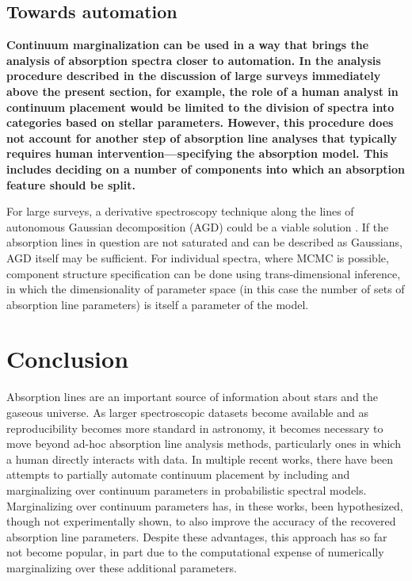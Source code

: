 \documentclass[manuscript]{aastex62}
\begin{document}
\subsection{Towards automation}
{\bf
Continuum marginalization can be used in a way that brings the analysis of absorption spectra closer to automation.
In the analysis procedure described in the discussion of large surveys immediately above the present section, for example, the role of a human analyst in continuum placement would be limited to the division of spectra into categories based on stellar parameters.
However, this procedure does not account for another step of absorption line analyses that typically requires human intervention---specifying the absorption model.
This includes deciding on a number of components into which an absorption feature should be split.

For large surveys, a derivative spectroscopy technique along the lines of autonomous Gaussian decomposition (AGD) could be a viable solution \citep{2015AJ....149..138L,2019A&A...628A..78R}.
If the absorption lines in question are not saturated and can be described as Gaussians, AGD itself may be sufficient.
For individual spectra, where MCMC is possible, component structure specification can be done using trans-dimensional inference, in which the dimensionality of parameter space (in this case the number of sets of absorption line parameters) is itself a parameter of the model.
}

\section{Conclusion}
\label{sec:conclusion}
Absorption lines are an important source of information about stars and the gaseous universe.
As larger spectroscopic datasets become available and as reproducibility becomes more standard in astronomy, it becomes necessary to move beyond ad-hoc absorption line analysis methods, particularly ones in which a human directly interacts with data.
In multiple recent works, there have been attempts to partially automate continuum placement by including and marginalizing over continuum parameters in probabilistic spectral models.
Marginalizing over continuum parameters has, in these works, been hypothesized, though not experimentally shown, to also improve the accuracy of the recovered absorption line parameters.
Despite these advantages, this approach has so far not become popular, in part due to the computational expense of numerically marginalizing over these additional parameters.
\end{document}
